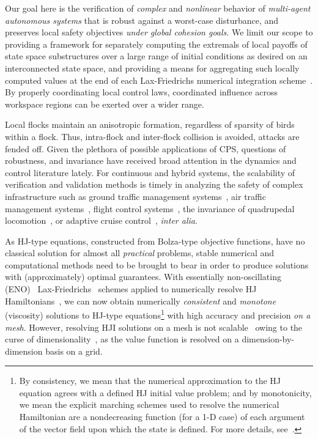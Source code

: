 Our goal here is the verification of  \textit{complex} and \textit{nonlinear} behavior of  \textit{multi-agent autonomous systems} that is robust against a worst-case disturbance, and preserves local safety objectives \textit{under global cohesion goals}. We limit our scope to providing a framework for separately computing the extremals of local payoffs of state space substructures over a large range of initial conditions as desired on an interconnected state space,   and providing a means for aggregating such locally computed values at the end of each Lax-Friedrichs numerical integration scheme~\cite{Crandall1984Approx, OsherShuENO}. By properly coordinating local control laws, coordinated influence across workspace regions can be exerted over a wider range. 


Local flocks maintain an anisotropic formation, regardless of sparsity of birds within a flock. Thus, intra-flock and inter-flock collision is avoided, attacks are fended off. 
Given the plethora of possible applications of CPS, questions of robustness, and invariance have received broad attention in the dynamics and control literature lately. For continuous and hybrid systems, the scalability of  verification and validation methods is timely in analyzing the safety of complex infrastructure such as ground traffic management systems~\cite{GroundTrafficMgt}, air traffic management systems~\cite{Tomlin2000Game}, flight control systems~\cite{Mitchell2020, SylviaScalability}, the invariance of quadrupedal locomotion~\cite{QuadCBF}, or adaptive cruise control~\cite{CBFCruiseControl}, \textit{inter alia}. 

As HJ-type equations, constructed from Bolza-type objective functions, have no classical solution for almost all \textit{practical} problems, stable numerical and computational methods need to be brought to bear in order to produce solutions with (approximately) optimal guarantees. With essentially non-oscillating (ENO)~\cite{OsherShuENO} Lax-Friedrichs~\cite{CrandallLaxFriedrichs} schemes applied to numerically resolve HJ Hamiltonians~\cite{Evans1984}, we can now obtain  numerically \textit{consistent} and \textit{monotone} (viscosity) solutions to HJ-type equations\footnote{By consistency, we mean that the numerical approximation to the HJ equation agrees with a defined HJ initial value problem; and by monotonicity, we mean the explicit marching schemes used to resolve the numerical Hamiltonian are a nondecreasing function (for a 1-D case) of each argument of the vector field upon which the state is defined. For more details, see~\cite{Crandall1984Approx, OsherShuENO}.} with high accuracy and precision \textit{on a mesh}. However, resolving HJI solutions on a mesh is not scalable~\cite{SylviaScalability, Bansal2018, Bajcsy} owing to the curse of dimensionality~\cite{Bellman1957}, as the value function is resolved on a dimension-by-dimension basis on a grid. 

